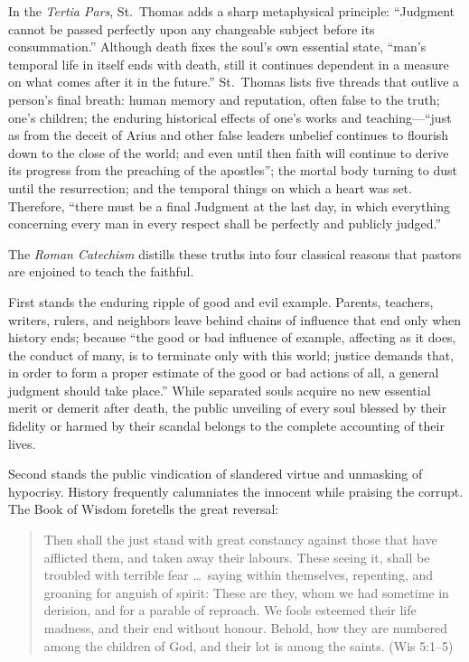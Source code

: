 In the \textit{Tertia Pars}, St.\ Thomas adds a sharp metaphysical principle: ``Judgment cannot be passed perfectly upon any changeable subject before its consummation.'' Although death fixes the soul's own essential state, ``man's temporal life in itself ends with death, still it continues dependent in a measure on what comes after it in the future.'' St.\ Thomas lists five threads that outlive a person's final breath: human memory and reputation, often false to the truth; one's children; the enduring historical effects of one's works and teaching---``just as from the deceit of Arius and other false leaders unbelief continues to flourish down to the close of the world; and even until then faith will continue to derive its progress from the preaching of the apostles''; the mortal body turning to dust until the resurrection; and the temporal things on which a heart was set. Therefore, ``there must be a final Judgment at the last day, in which everything concerning every man in every respect shall be perfectly and publicly judged.''

The \textit{Roman Catechism} distills these truths into four classical reasons that pastors are enjoined to teach the faithful.

First stands the enduring ripple of good and evil example. Parents, teachers, writers, rulers, and neighbors leave behind chains of influence that end only when history ends; because ``the good or bad influence of example, affecting as it does, the conduct of many, is to terminate only with this world; justice demands that, in order to form a proper estimate of the good or bad actions of all, a general judgment should take place.'' While separated souls acquire no new essential merit or demerit after death, the public unveiling of every soul blessed by their fidelity or harmed by their scandal belongs to the complete accounting of their lives.

Second stands the public vindication of slandered virtue and unmasking of hypocrisy. History frequently calumniates the innocent while praising the corrupt. The Book of Wisdom foretells the great reversal:

\begin{quote}
Then shall the just stand with great constancy against those that have afflicted them, and taken away their labours. These seeing it, shall be troubled with terrible fear \dots\ saying within themselves, repenting, and groaning for anguish of spirit: These are they, whom we had sometime in derision, and for a parable of reproach. We fools esteemed their life madness, and their end without honour. Behold, how they are numbered among the children of God, and their lot is among the saints. (Wis 5:1--5)
\end{quote}

